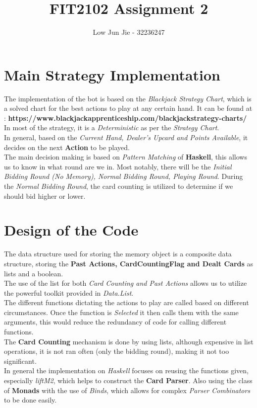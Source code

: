\documentclass{article}
\title{FIT2102 Assignment 2}
\date{}
\author{Low Jun Jie - 32236247}
\begin{document}
	\maketitle
	\section{Main Strategy Implementation}
	The implementation of the bot is based on the \emph{Blackjack Strategy Chart}, which is a solved chart for the best actions to play at any certain hand. It can be found at : \textbf{https://www.blackjackapprenticeship.com/blackjackstrategy-charts/}\\
	In most of the strategy, it is a \emph{Deterministic} as per the \emph{Strategy Chart}. \\
	In general, based on the \emph{Current Hand, Dealer's Upcard and Points Available}, it decides on the next \textbf{Action} to be played.\\
	The main decision making is based on \emph{Pattern Matching} of \textbf{Haskell}, this allows us to know in what round are we in. Most notably, there will be the \emph{Initial Bidding Round (No Memory), Normal Bidding Round, Playing Round}. During the \emph{Normal Bidding Round}, the card counting is utilized to determine if we should bid higher or lower.\\
	\section{Design of the Code}
	The data structure used for storing the memory object is a composite data structure, storing the \textbf{Past Actions, CardCountingFlag and Dealt Cards} as lists and a boolean.\\
	The use of the list for both \emph{Card Counting and Past Actions} allows us to utilize the powerful toolkit provided in \emph{Data.List}.\\
	The different functions dictating the actions to play are called based on different circumstances. Once the function is \emph{Selected} it then calls them with the same arguments, this would reduce the redundancy of code for calling different functions.\\
	The \textbf{Card Counting} mechanism is done by using lists, although expensive in list operations, it is not ran often (only the bidding round), making it not too significant.\\
	In general the implementation on \emph{Haskell} focuses on reusing the functions given, especially \emph{liftM2}, which helps to construct the \textbf{Card Parser}. Also using the class of \textbf{Monads} with the use of \emph{Binds}, which allows for complex \emph{Parser Combinators} to be done easily.
\end{document}
